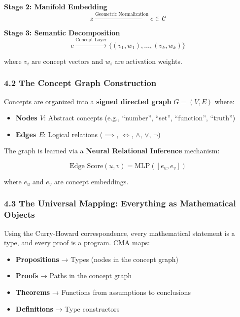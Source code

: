 \documentclass[
  11pt,
  a4paper,
]{article}
\providecommand{\tightlist}{%
  \setlength{\itemsep}{0pt}\setlength{\parskip}{0pt}}
\begin{document}
\textbf{Stage 2: Manifold Embedding}
\[z \xrightarrow{\text{Geometric Normalization}} c \in \mathcal{C}\]

\textbf{Stage 3: Semantic Decomposition}
\[c \xrightarrow{\text{Concept Layer}} \{(v_1, w_1), \dots, (v_k, w_k)\}\]

where \(v_i\) are concept vectors and \(w_i\) are activation weights.

\subsubsection{4.2 The Concept Graph
Construction}\label{the-concept-graph-construction}

Concepts are organized into a \textbf{signed directed graph}
\(G = (V, E)\) where:

\begin{itemize}
\tightlist
\item
  \textbf{Nodes \(V\)}: Abstract concepts (e.g., ``number'', ``set'',
  ``function'', ``truth'')
\item
  \textbf{Edges \(E\)}: Logical relations (\(\implies\), \(\iff\),
  \(\land\), \(\lor\), \(\neg\))
\end{itemize}

The graph is learned via a \textbf{Neural Relational Inference}
mechanism:

\[\text{Edge Score}(u, v) = \text{MLP}([e_u, e_v])\]

where \(e_u\) and \(e_v\) are concept embeddings.

\subsubsection{4.3 The Universal Mapping: Everything as Mathematical
Objects}\label{the-universal-mapping-everything-as-mathematical-objects}

Using the Curry-Howard correspondence, every mathematical statement is a
type, and every proof is a program. CMA maps:

\begin{itemize}
\tightlist
\item
  \textbf{Propositions} → Types (nodes in the concept graph)
\item
  \textbf{Proofs} → Paths in the concept graph
\item
  \textbf{Theorems} → Functions from assumptions to conclusions
\item
  \textbf{Definitions} → Type constructors
\end{itemize}
\end{document}
